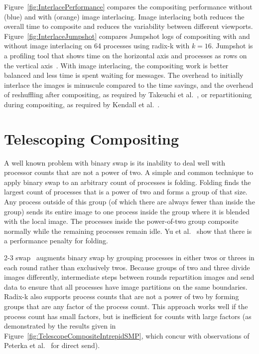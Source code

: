 \documentclass{acm_proc_article-sp}
\newcommand*{\lcite}[1]{~\cite{#1}}
\newcommand*{\scite}[1]{~\cite{#1}}
\newcommand{\etal}{et al.}
\begin{document}
Figure~\ref{fig:InterlacePerformance} compares the compositing performance
without (blue) and with (orange) image interlacing.  Image interlacing both
reduces the overall time to composite and reduces the variability between
different viewports.  Figure~\ref{fig:InterlaceJumpshot} compares Jumpshot
logs of compositing with and without image interlacing on 64 processes
using radix-k with $k = 16$.  Jumpshot is a profiling tool that shows time
on the horizontal axis and processes as rows on the vertical
axis\lcite{Chan2008}.  With image interlacing, the compositing work is
better balanced and less time is spent waiting for messages.  The overhead
to initially interlace the images is minuscule compared to the time
savings, and the overhead of reshuffling after compositing, as required by
Takeuchi \etal\scite{Takeuchi2003}, or repartitioning during compositing,
as required by Kendall \etal\scite{Kendall2010}.

\section{Telescoping Compositing}
\label{sec:TelescopingCompositing}

A well known problem with binary swap is its inability to deal well with
processor counts that are not a power of two.  A simple and common
technique to apply binary swap to an arbitrary count of processes is
folding.  Folding finds the largest count of processes that is a power of
two and forms a group of that size.  Any process outside of this group (of
which there are always fewer than inside the group) sends its entire image
to one process inside the group where it is blended with the local image.
The processes inside the power-of-two group composite normally while the
remaining processes remain idle.  Yu \etal\scite{23Swap} show that there is
a performance penalty for folding.

2-3 swap\lcite{23Swap} augments binary swap by grouping processes in either
twos or threes in each round rather than exclusively twos.  Because groups
of two and three divide images differently, intermediate steps between
rounds repartition images and send data to ensure that all processes have
image partitions on the same boundaries.  Radix-k also supports process
counts that are not a power of two by forming groups that are any factor of
the process count.  This approach works well if the process count has small
factors, but is inefficient for counts with large factors (as demonstrated
by the results given in Figure~\ref{fig:TelescopeCompositeIntrepidSMP},
which concur with observations of Peterka \etal\scite{Peterka2009} for
direct send).
\end{document}
